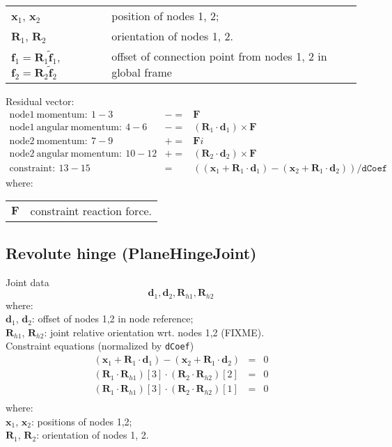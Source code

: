 \documentclass[10pt,dvips,fleqn]{report}
\newcommand{\T}[1]{\boldsymbol{#1}}
\begin{document}
\noindent
\begin{tabular}{ll}
$\T{x}_1$, $\T{x}_2$ & position of nodes 1, 2; \\
$\T{R}_1$, $\T{R}_2$ & orientation of nodes 1, 2.\\
$\T{f}_1 = \T{R}_1 \tilde{\T{f}}_1$, $\T{f}_2 = \T{R}_2 \tilde{\T{f}}_2$ & offset of connection point from nodes 1, 2 in global frame
\end{tabular}

\noindent
Residual vector:
\begin{eqnarray*}
	\mathrm{node1\ momentum}:\ 1-3& -= & \T F \\
	\mathrm{node1\ angular\ momentum}:\ 4-6& -= & 
		(\T R_1\cdot \T d_1) \times \T F \\
	\mathrm{node2\ momentum}:\ 7-9& += & \T Fi \\
	\mathrm{node2\ angular\ momentum}:\ 10-12& += & 
		(\T R_2\cdot \T d_2) \times \T F \\
	\mathrm{constraint}:\ 13-15& = &  ((\T x_1+\T R_1\cdot \T d_1) - 
			(\T x_2+\T R_1\cdot \T d_2))/\texttt{dCoef}
\end{eqnarray*}
where:

\noindent
\begin{tabular}{ll}
$\T{F}$ & constraint reaction force.
\end{tabular}



\subsection{Revolute hinge (PlaneHingeJoint)}
Joint data
\begin{equation}
\T d_1, \T d_2, \T R_{h1}, \T R_{h2}
\end{equation}
where:\\
$\T d_1$, $\T d_2$: offset of nodes 1,2 in node reference;\\
$\T R_{h1}$, $\T R_{h2}$: joint relative orientation wrt. nodes 1,2 (FIXME).\\

\noindent
Constraint equations (normalized by \texttt{dCoef})
\begin{eqnarray*}
	(\T x_1+\T R_1\cdot \T d_1) - (\T x_2+\T R_1\cdot \T d_2)& = & 0 \\
	(\T R_1\cdot \T R_{h1})[3]\cdot (\T R_2\cdot \T R_{h2})[2] & = & 0 \\
	(\T R_1\cdot \T R_{h1})[3]\cdot (\T R_2\cdot \T R_{h2})[1] & = & 0 \\
\end{eqnarray*}
where:\\
$\T x_1$, $\T x_2$: positions of nodes 1,2;\\
$\T R_{1}$, $\T R_{2}$: orientation of nodes 1, 2.\\
\end{document}
